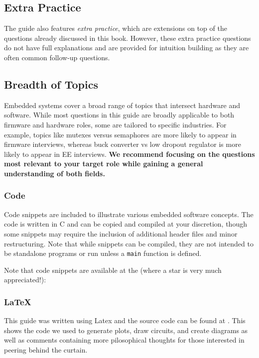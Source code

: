 \documentclass[main.tex]{subfiles}
\begin{document}
\subsection{Extra Practice}
The guide also features \textit{extra practice}, which are extensions on top of the questions already discussed in this book. However, these extra practice questions do not have full explanations and are provided for intuition building as they are often common follow-up questions. 

\subsection {Breadth of Topics}
Embedded systems cover a broad range of topics that intersect hardware and software. While most questions in this guide are broadly applicable to both firmware and hardware roles, some are tailored to specific industries. For example, topics like mutexes versus semaphores are more likely to appear in firmware interviews, whereas buck converter vs low dropout regulator is more likely to appear in EE interviews. \textbf{We recommend focusing on the questions most relevant to your target role while gaining a general understanding of both fields.}

\subsubsection{Code}
Code snippets are included to illustrate various embedded software concepts. The code is written in C and can be copied and compiled at your discretion, though some snippets may require the inclusion of additional header files and minor restructuring. Note that while snippets can be compiled, they are not intended to be standalone programs or run unless a \texttt{main} function is defined.

\noindent Note that code snippets are available at the  (where a star is very much appreciated!):  

\subsubsection{LaTeX}
This guide was written using Latex and the source code can be found at . This shows the code we used to generate plots, draw circuits, and create diagrams as well as comments containing more pilosophical thoughts for those interested in peering behind the curtain.
\end{document}
